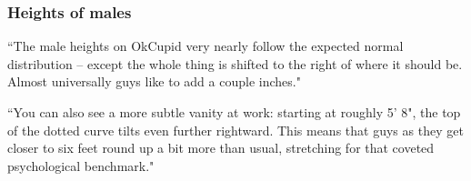 \begin{frame}
\frametitle{Heights of males}

{
\pause
{\footnotesize``The male heights on OkCupid very nearly follow the expected normal distribution -- except the whole thing is shifted to the right of where it should be. Almost universally guys like to add a couple inches." 

``You can also see a more subtle vanity at work: starting at roughly 5' 8", the top of the dotted curve tilts even further rightward. This means that guys as they get closer to six feet round up a bit more than usual, stretching for that coveted psychological benchmark."
}
}


\end{frame}


